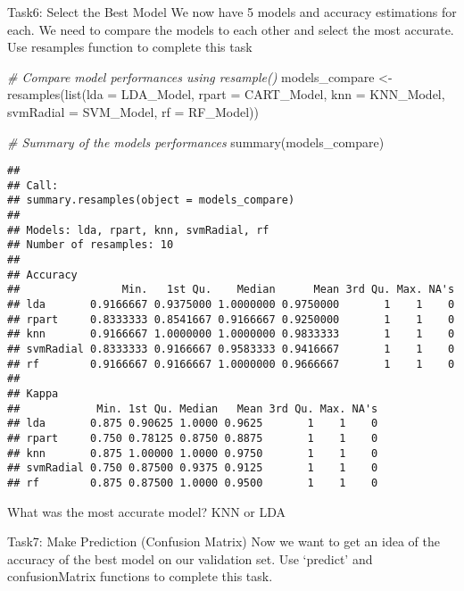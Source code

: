 \documentclass[
]{article}
\newenvironment{Shaded}{\begin{snugshade}}{\end{snugshade}}
\newcommand{\AttributeTok}[1]{\textcolor[rgb]{0.77,0.63,0.00}{#1}}
\newcommand{\CommentTok}[1]{\textcolor[rgb]{0.56,0.35,0.01}{\textit{#1}}}
\newcommand{\FunctionTok}[1]{\textcolor[rgb]{0.00,0.00,0.00}{#1}}
\newcommand{\NormalTok}[1]{#1}
\newcommand{\OtherTok}[1]{\textcolor[rgb]{0.56,0.35,0.01}{#1}}
\newcommand{\SpecialCharTok}[1]{\textcolor[rgb]{0.00,0.00,0.00}{#1}}
\begin{document}
Task6: Select the Best Model We now have 5 models and accuracy
estimations for each. We need to compare the models to each other and
select the most accurate. Use resamples function to complete this task

\begin{Shaded}
\begin{Highlighting}[]
\CommentTok{\# Compare model performances using resample()}
\NormalTok{models\_compare }\OtherTok{\textless{}{-}} \FunctionTok{resamples}\NormalTok{(}\FunctionTok{list}\NormalTok{(}\AttributeTok{lda =}\NormalTok{ LDA\_Model, }\AttributeTok{rpart =}\NormalTok{ CART\_Model, }\AttributeTok{knn =}\NormalTok{ KNN\_Model, }\AttributeTok{svmRadial =}\NormalTok{ SVM\_Model, }\AttributeTok{rf =}\NormalTok{ RF\_Model))}

\CommentTok{\# Summary of the models performances}
\FunctionTok{summary}\NormalTok{(models\_compare)}
\end{Highlighting}
\end{Shaded}

\begin{verbatim}
## 
## Call:
## summary.resamples(object = models_compare)
## 
## Models: lda, rpart, knn, svmRadial, rf 
## Number of resamples: 10 
## 
## Accuracy 
##                Min.   1st Qu.    Median      Mean 3rd Qu. Max. NA's
## lda       0.9166667 0.9375000 1.0000000 0.9750000       1    1    0
## rpart     0.8333333 0.8541667 0.9166667 0.9250000       1    1    0
## knn       0.9166667 1.0000000 1.0000000 0.9833333       1    1    0
## svmRadial 0.8333333 0.9166667 0.9583333 0.9416667       1    1    0
## rf        0.9166667 0.9166667 1.0000000 0.9666667       1    1    0
## 
## Kappa 
##            Min. 1st Qu. Median   Mean 3rd Qu. Max. NA's
## lda       0.875 0.90625 1.0000 0.9625       1    1    0
## rpart     0.750 0.78125 0.8750 0.8875       1    1    0
## knn       0.875 1.00000 1.0000 0.9750       1    1    0
## svmRadial 0.750 0.87500 0.9375 0.9125       1    1    0
## rf        0.875 0.87500 1.0000 0.9500       1    1    0
\end{verbatim}

What was the most accurate model? KNN or LDA

Task7: Make Prediction (Confusion Matrix) Now we want to get an idea of
the accuracy of the best model on our validation set. Use `predict' and
confusionMatrix functions to complete this task.

\begin{Shaded}
\end{Shaded}
\end{document}
